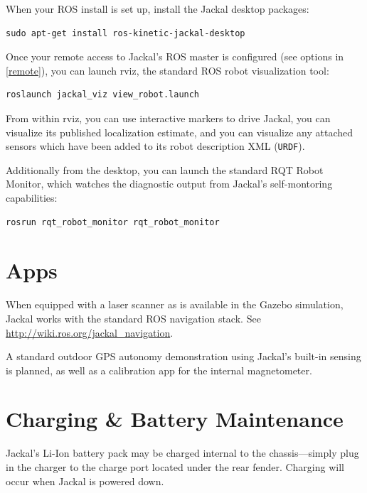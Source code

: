 \documentclass[]{clearpath-latex/clearpath-manual}
\begin{document}
When your ROS install is set up, install the Jackal desktop packages:

\begin{lstlisting}
sudo apt-get install ros-kinetic-jackal-desktop
\end{lstlisting}

Once your remote access to Jackal's ROS master is configured (see options in \autoref{remote}),
you can launch rviz, the standard ROS robot visualization tool:

\begin{lstlisting}
roslaunch jackal_viz view_robot.launch
\end{lstlisting}

From within rviz, you can use interactive markers to drive Jackal, you can visualize its
published localization estimate, and you can visualize any attached sensors which have been
added to its robot description XML (\lstinline{URDF}).

Additionally from the desktop, you can launch the standard RQT Robot Monitor, which
watches the diagnostic output from Jackal's self-montoring capabilities:

\begin{lstlisting}
rosrun rqt_robot_monitor rqt_robot_monitor
\end{lstlisting}



\section{Apps}

When equipped with a laser scanner as is available in the Gazebo simulation, Jackal works with the
standard ROS navigation stack. See \url{http://wiki.ros.org/jackal_navigation}.

A standard outdoor GPS autonomy demonstration using Jackal's built-in sensing is planned, as well
as a calibration app for the internal magnetometer.


\section{Charging \& Battery Maintenance}

Jackal's Li-Ion battery pack may be charged internal to the chassis---simply plug in
the charger to the charge port located under the rear fender. Charging will occur
when Jackal is powered down.
\end{document}
